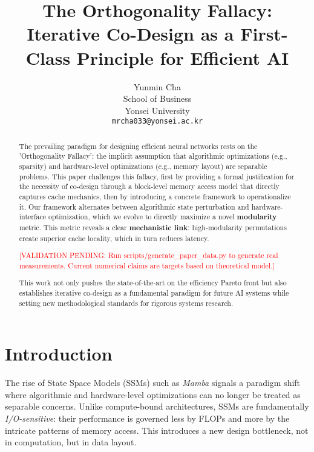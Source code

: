 \documentclass{article}
\title{The Orthogonality Fallacy: Iterative Co-Design as a First-Class Principle for Efficient AI}
\author{
Yunmin Cha \\
School of Business\\
Yonsei University\\
\texttt{mrcha033@yonsei.ac.kr}
}
\begin{document}
\maketitle

\begin{abstract}
The prevailing paradigm for designing efficient neural networks rests on the 'Orthogonality Fallacy': the implicit assumption that algorithmic optimizations (e.g., sparsity) and hardware-level optimizations (e.g., memory layout) are separable problems. This paper challenges this fallacy, first by providing a formal justification for the necessity of co-design through a block-level memory access model that directly captures cache mechanics, then by introducing a concrete framework to operationalize it. Our framework alternates between algorithmic state perturbation and hardware-interface optimization, which we evolve to directly maximize a novel \textbf{modularity} metric. This metric reveals a clear \textbf{mechanistic link}: high-modularity permutations create superior cache locality, which in turn reduces latency.

\textcolor{red}{[VALIDATION PENDING: Run scripts/generate\_paper\_data.py to generate real measurements. Current numerical claims are targets based on theoretical model.]}


This work not only pushes the state-of-the-art on the efficiency Pareto front but also establishes iterative co-design as a fundamental paradigm for future AI systems while setting new methodological standards for rigorous systems research.
\end{abstract}

\section{Introduction}

The rise of State Space Models (SSMs) such as \textit{Mamba} \citep{gu2024mamba} signals a paradigm shift where algorithmic and hardware-level optimizations can no longer be treated as separable concerns. Unlike compute-bound architectures, SSMs are fundamentally \textit{I/O-sensitive}: their performance is governed less by FLOPs and more by the intricate patterns of memory access. This introduces a new design bottleneck, not in computation, but in data layout.
\end{document}
